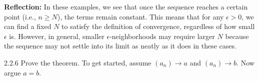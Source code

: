{    \textbf{Reflection:} In these examples, we see that once the sequence reaches a certain point (i.e., \(n \geq N\)), the terms remain constant. This means that for any \(\epsilon > 0\), we can find a fixed \(N\) to satisfy the definition of convergence, regardless of how small \(\epsilon\) is. However, in general, smaller \(\epsilon\)-neighborhoods may require larger \(N\) because the sequence may not settle into its limit as neatly as it does in these cases.
}

\begin{exercise}
    {2.2.6} Prove the  theorem. To get started, assume \((a_{n}) \rightarrow a \) and \((a_{n}) \rightarrow b\). Now argue \(a = b\).
\end{exercise}


